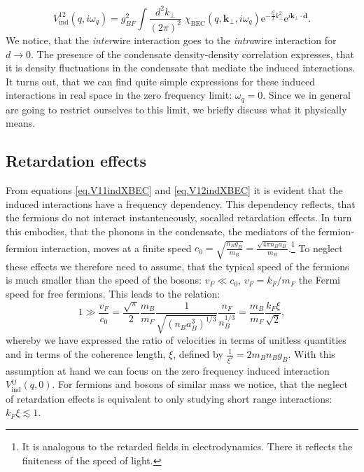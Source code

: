 \begin{equation}
V_{\text{ind}}^{12}(q,i\omega_q) = g_{BF}^2\int\frac{d^2k_\perp}{(2\pi)^2}\; \chi_\text{BEC}(q,\mathbf{k}_\perp, i\omega_q)\text{e}^{-\frac{l_t^2}{2}k_\perp^2}\text{e}^{i\mathbf{k}_\perp\cdot \mathbf{d}}. 
\label{eq.V12indXBEC} 
\end{equation}
We notice, that the \textit{inter}wire interaction goes to the \textit{intra}wire interaction for $d \to 0$. The presence of the condensate density-density correlation expresses, that it is density fluctuations in the condensate that mediate the induced interactions. It turns out, that we can find quite simple expressions for these induced interactions in real space in the zero frequency limit: $\omega_q = 0$. Since we in general are going to restrict ourselves to this limit, we briefly discuss what it physically means. 

\subsection{Retardation effects} \label{sec.RetardationEffects}
From equations \eqref{eq.V11indXBEC} and \eqref{eq.V12indXBEC} it is evident that the induced interactions have a frequency dependency. This dependency reflects, that the fermions do not interact instanteneously, socalled retardation effects. In turn this embodies, that the phonons in the condensate, the mediators of the fermion-fermion interaction, moves at a finite speed $c_0 = \sqrt{\frac{n_Bg_B}{m_B}} = \frac{\sqrt{4\pi n_B a_B}}{m_B}$.\footnote{It is analogous to the retarded fields in electrodynamics. There it reflects the finiteness of the speed of light.} To neglect these effects we therefore need to assume, that the typical speed of the fermions is much smaller than the speed of the bosons: $v_F \ll c_0$, $v_F = k_F/m_F$ the Fermi speed for free fermions. This leads to the relation:
\begin{equation}
1 \gg \frac{v_F}{c_0} = \frac{\sqrt{\pi}}{2} \frac{m_B}{m_F}\frac{1}{ \sqrt{ (n_Ba_B^3)^{1/3} } }\frac{n_F}{ n_B^{1/3} } = \frac{m_B}{m_F}\frac{k_F\xi}{\sqrt{2}}, 
\label{eq.RetardationEffectsneglectionassumption}
\end{equation}
whereby we have expressed the ratio of velocities in terms of unitless quantities and in terms of the coherence length, $\xi$, defined by $\frac{1}{\xi^2} = 2m_Bn_Bg_B$. With this assumption at hand we can focus on the zero frequency induced interaction $V^{ij}_{\text{ind}}(q,0)$. For fermions and bosons of similar mass we notice, that the neglect of retardation effects is equivalent to only studying short range interactions: $k_F\xi \lesssim 1$. 

